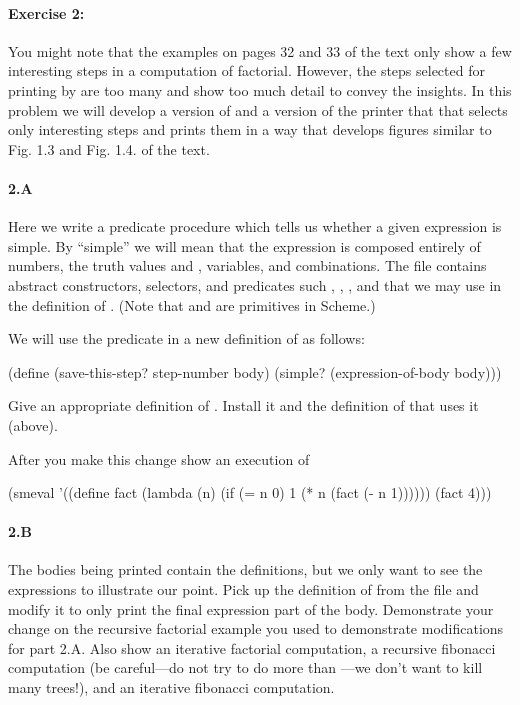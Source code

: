 \paragraph{Exercise 2:} You might note that the examples on
pages 32 and 33 of the text only show a few interesting steps in a
computation of factorial.  However, the steps selected for printing by
 are too many and show too much detail to convey the insights.  
In this problem we will develop a version of 
and a version of the printer that that selects only interesting steps
and prints them in a way that develops figures similar to Fig. 1.3 and
Fig. 1.4. of the text.

\paragraph{2.A} Here we write a predicate procedure
 which tells us whether a given expression is
simple.  By ``simple'' we will mean that the expression is composed
entirely of numbers, the truth values  and ,
variables, and combinations.  The file  contains
abstract constructors, selectors, and predicates such
, , , and
 that we may use in the definition of .
(Note that  and  are primitives in
Scheme.)

We will use the  predicate in a new definition of
 as follows: 

\beginlispbig
(define (save-this-step? step-number body)
  (simple? (expression-of-body body)))
\endlisp

Give an appropriate definition of .  Install it and the
definition of  that uses it (above). 

After you make this change show an execution of

\beginlispbig
(smeval 
  '((define fact 
      (lambda (n) 
        (if (= n 0)
            1
            (* n (fact (- n 1))))))
    (fact 4)))
\endlisp

\paragraph{2.B} The bodies being printed contain the definitions, but
we only want to see the expressions to illustrate our point.  Pick up
the definition of  from the file
 and modify it to only print the final expression
part of the body.  Demonstrate your change on the recursive factorial
example you used to demonstrate modifications for part 2.A.  Also show
an iterative factorial computation, a recursive
fibonacci computation (be careful---do not try to do more than 
---we don't want to kill many trees!), and an iterative
fibonacci computation.


